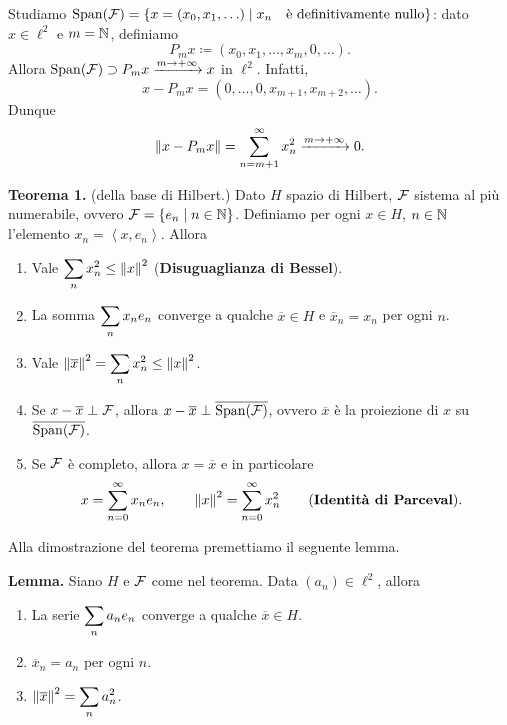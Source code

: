 Studiamo $\operatorname{Span}(\mathcal{F}) = \left\{ x = (x_0,x_1,\ldots ) \;\middle|\; x_n \quad \text{è definitivamente nullo}  \right\}$: dato $x \in \ell^2$ e $m = \mathbb N$, definiamo
%
$$
P_mx \coloneqq (x_0,x_1,\ldots , x_m,0,\ldots ).
$$
%
Allora $\operatorname{Span}(\mathcal{F}) \supset P_m x \xrightarrow{m \to +\infty} x$ in $\ell^2$.
Infatti, 
%
$$
x - P_m x = (0,\ldots ,0, x_{m+1}, x_{m+2},\ldots ).
$$
%
Dunque
%
$$
\left\lVert x - P_m x \right\rVert = \sum_{n = m+1}^{\infty} x_n^2 \xrightarrow{m \to +\infty} 0.
$$
%

\textbf{Teorema 1.} (della base di Hilbert.) Dato $H$ spazio di Hilbert, $\mathcal{F}$ sistema al più numerabile, ovvero $\mathcal{F} = \left\{ e_n \;\middle|\; n \in \mathbb N \right\}$.
Definiamo per ogni $x \in H$, $n \in \mathbb N$ l'elemento $x_n = \left<x, e_n \right>$.
Allora
\begin{enumerate}
\item \label{item:27ott_thm1_1}
Vale $\displaystyle \sum_{n} x_n^2 \leq \left\lVert x \right\rVert^2$ (\textbf{Disuguaglianza di Bessel}).

\item \label{item:27ott_thm1_2}
La somma $\displaystyle \sum_n x_n e_n$ converge a qualche $\overline{x} \in H$ e $\overline{x}_n = x_n$  per ogni $n$.

\item \label{item:27ott_thm1_3}
Vale $\displaystyle \left\lVert \overline{x} \right\rVert^2 = \sum_n x_n^2 \leq \left\lVert x \right\rVert^2$.

\item \label{item:27ott_thm1_4}
Se $x - \overline{x} \perp \mathcal{F}$, allora $x - \overline{x} \perp \overline{\operatorname{Span}(\mathcal{F})}$, ovvero $\overline{x}$ è la proiezione di $x$ su $\overline{\operatorname{Span}(\mathcal{F})}$.

\item \label{item:27ott_thm1_5}
Se $\mathcal{F}$ è completo, allora $x = \overline{x}$ e in particolare
%
$$
x = \sum_{n=0}^{\infty} x_n e_n, \qquad \left\lVert x \right\rVert^2 = \sum_{n=0}^{\infty} x_n^2  \qquad \text{(\textbf{Identità di Parceval})}.
$$
%
\end{enumerate}



Alla dimostrazione del teorema premettiamo il seguente lemma.

\vs

\textbf{Lemma.} Siano $H$ e $\mathcal{F}$ come nel teorema.
Data $(a_n) \in \ell^2$, allora
\begin{enumerate}
\item La serie $\displaystyle \sum_n a_n e_n$ converge a qualche $\overline{x} \in H$. 

\item $\overline{x}_n = a_n$ per ogni $n$.

\item $\displaystyle \left\lVert \overline{x} \right\rVert^2 = \sum_n a_n^2$.
\end{enumerate}


